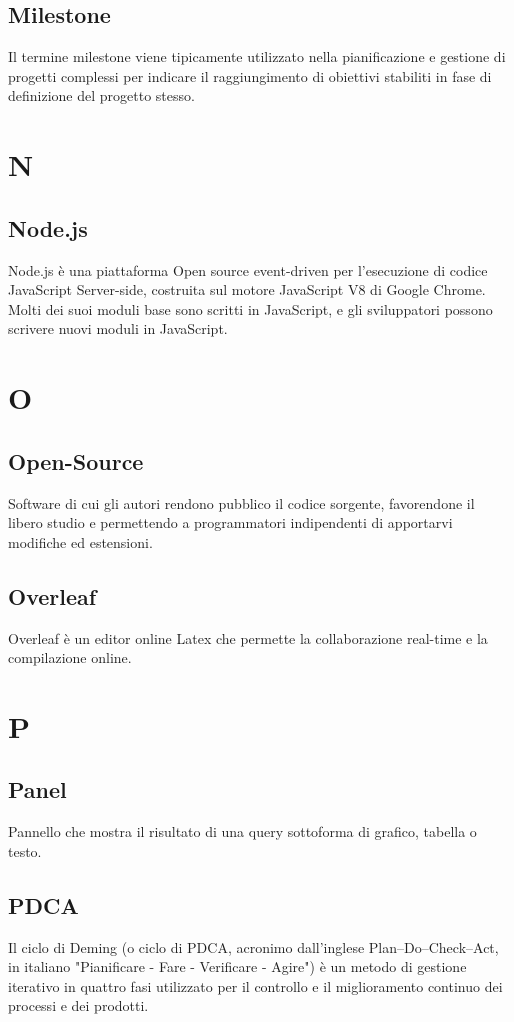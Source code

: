     \subsection*{Milestone}
Il termine milestone viene tipicamente utilizzato nella pianificazione e gestione di progetti complessi per indicare il raggiungimento di obiettivi stabiliti in fase di definizione del progetto stesso.
\newpage

\section{N}
    \subsection*{Node.js}
Node.js è una piattaforma Open source event-driven per l'esecuzione di codice JavaScript Server-side, costruita sul motore JavaScript V8 di Google Chrome. Molti dei suoi moduli base sono scritti in JavaScript, e gli sviluppatori possono scrivere nuovi moduli in JavaScript.
\newpage

\section{O}
    \subsection*{Open-Source}
Software di cui gli autori rendono pubblico il codice sorgente, favorendone il libero studio e permettendo a programmatori indipendenti di apportarvi modifiche ed estensioni.
    \subsection*{Overleaf}
Overleaf è un editor online Latex che permette la collaborazione real-time e la compilazione online.
\newpage

\section{P}
    \subsection*{Panel}
Pannello che mostra il risultato di una query sottoforma di grafico, tabella o testo.
    \subsection*{PDCA}
Il ciclo di Deming (o ciclo di PDCA, acronimo dall’inglese Plan–Do–Check–Act, in italiano "Pianificare - Fare - Verificare - Agire") è un metodo di gestione iterativo in quattro fasi utilizzato per il controllo e il miglioramento continuo dei processi e dei prodotti.
